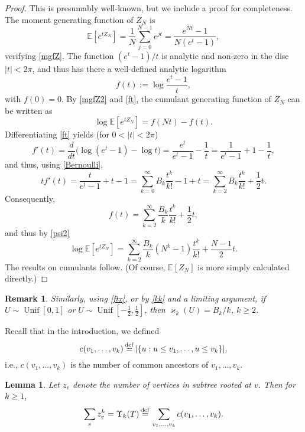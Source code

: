 \documentclass[11pt]{article}
\newcommand{\E}[1]{\mathbb{E} \left[#1\right]}
\def\U{\Upsilon}
\numberwithin{theorem}{section}
\newtheorem{lemma}[theorem]{Lemma}
\newtheorem{remark}[theorem]{Remark}
\theoremstyle{definition}
\newcommand{\eqd}{\,{\buildrel {\mathrm{def}} \over =}\,}
\newcommand{\Unif}{\mathop{\mathrm{Unif}}}
\numberwithin{equation}{section}
\newcommand\kk{\varkappa}
\newcommand\bigpar[1]{\bigl(#1\bigr)}
\begin{document}
\begin{proof}
This is presumably well-known, but we include a proof for completeness.
%
The moment generating function of $Z_N$ is
\begin{equation}\label{mgfZ2}
  \E{e^{tZ_N}} = \frac{1}N\sum_{j=0}^{N-1} e^{jt} 
=  \frac{e^{Nt}-1}{N(e^t-1)},
\end{equation}
verifying \eqref{mgfZ}.
The function $(e^t-1)/t$ is analytic and non-zero in the disc $|t|<2\pi$,
and thus has there a well-defined analytic logarithm
\begin{equation}\label{ft}
  f(t):=\log\frac{e^t-1}{t},
\end{equation}
with $f(0)=0$.
By \eqref{mgfZ2} and \eqref{ft}, 
the cumulant generating function of $Z_N$ can be written as
\begin{equation}\label{psi2}
  \log\E{e^{tZ_N}} = f(Nt)-f(t).
\end{equation}
Differentiating \eqref{ft} yields (for $0<|t|<2\pi$)
\begin{equation}
  f'(t) = \frac{d}{dt}\bigpar{\log(e^t-1)-\log t}
=\frac{e^t}{e^t-1}-\frac{1}t
=\frac{1}{e^t-1}+1-\frac{1}t
,
\end{equation}
and thus, using \eqref{Bernoulli}, 
\begin{equation}
 t f'(t)
=\frac{t}{e^t-1}+t-1
=  \sum_{k=0}^\infty B_k\frac{t^k}{k!} -1+t 
=  \sum_{k=2}^\infty B_k\frac{t^k}{k!} +\frac12 t. 
\end{equation}
Consequently,
\begin{equation}\label{ftx}
 f(t)
=  \sum_{k=2}^\infty \frac{B_k}{k}\frac{t^k}{k!} +\frac12 t,
\end{equation}
and thus by \eqref{psi2}
\begin{equation}
\log\E{e^{tZ_N}}
=  \sum_{k=2}^\infty \frac{B_k}{k}(N^k-1)\frac{t^k}{k!} +\frac{N-1}2 t 
. 
\end{equation}
The results on cumulants follow. 
(Of course, $\E{Z_N}$ is more  simply calculated directly.)
\end{proof}

\begin{remark}\label{RU}
  Similarly, using \eqref{ftx}, or by \eqref{kk} and a limiting argument,
if $U\sim\Unif[0,1]$ or $U\sim\Unif[-\frac12,\frac12]$, then
$\kk_k(U)=B_k/k$, $k\ge2$.
\end{remark}


Recall that in the introduction, we defined
\[
    c(v_{1},\dots,v_k) \eqd |\{u:u\le v_1, \dots, u \le v_k\}|,
\]
i.e., \(c(v_{1},\dots,v_{k})\) is the number of common ancestors of \(v_{1},\dots,v_{k}\).
\begin{lemma}
    \label{lem:common}
    Let \(z_v\) denote the number of vertices in subtree rooted at \(v\). Then for $k\geq 1$,
    \[
        \sum_{v} z_v^{k} = 
        \U_{k}(T) \eqd
        \sum_{v_1,\dots,v_k} c(v_{1},\dots,v_{k})
        .
    \]
\end{lemma}
\end{document}
